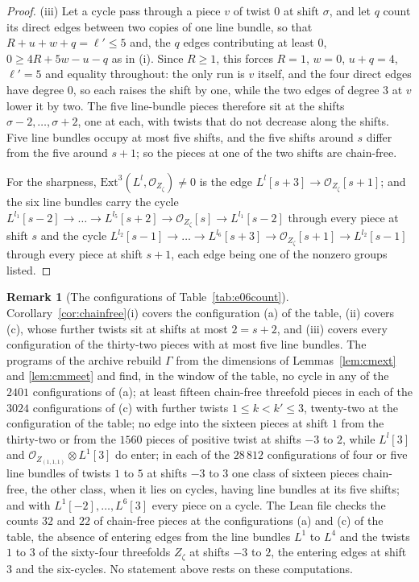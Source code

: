 \documentclass[11pt,reqno]{amsart}
\numberwithin{equation}{section}
\theoremstyle{plain}
\theoremstyle{definition}
\newtheorem{remark}[theorem]{Remark}
\newcommand{\Ext}{\mathrm{Ext}}
\begin{document}
\begin{proof}
(iii) Let a cycle pass through a piece $v$ of twist $0$ at shift $\sigma$, and let $q$ count its direct edges between two copies of one line bundle, so that $R+u+w+q=\ell'\le5$ and, the $q$ edges contributing at least $0$, $0\ge4R+5w-u-q$ as in (i). Since $R\ge1$, this forces $R=1$, $w=0$, $u+q=4$, $\ell'=5$ and equality throughout: the only run is $v$ itself, and the four direct edges have degree $0$, so each raises the shift by one, while the two edges of degree $3$ at $v$ lower it by two. The five line-bundle pieces therefore sit at the shifts $\sigma-2,\dots,\sigma+2$, one at each, with twists that do not decrease along the shifts. Five line bundles occupy at most five shifts, and the five shifts around $s$ differ from the five around $s+1$; so the pieces at one of the two shifts are chain-free.

For the sharpness, $\Ext^{3}(L^{l},\mathcal{O}_{Z_{\zeta}})\ne0$ is the edge $L^{l}[s+3]\to\mathcal{O}_{Z_{\zeta}}[s+1]$; and the six line bundles carry the cycle $L^{l_{1}}[s-2]\to\dots\to L^{l_{5}}[s+2]\to\mathcal{O}_{Z_{\zeta}}[s]\to L^{l_{1}}[s-2]$ through every piece at shift $s$ and the cycle $L^{l_{2}}[s-1]\to\dots\to L^{l_{6}}[s+3]\to\mathcal{O}_{Z_{\zeta}}[s+1]\to L^{l_{2}}[s-1]$ through every piece at shift $s+1$, each edge being one of the nonzero groups listed.
\end{proof}

\begin{remark}[The configurations of Table~\ref{tab:e06count}]\label{rem:chainfreecount}
Corollary~\ref{cor:chainfree}(i) covers the configuration (a) of the table, (ii) covers (c), whose further twists sit at shifts at most $2=s+2$, and (iii) covers every configuration of the thirty-two pieces with at most five line bundles. The programs of the archive rebuild $\Gamma$ from the dimensions of Lemmas~\ref{lem:cmext} and \ref{lem:cmmeet} and find, in the window of the table, no cycle in any of the $2401$ configurations of (a); at least fifteen chain-free threefold pieces in each of the $3024$ configurations of (c) with further twists $1\le k<k'\le3$, twenty-two at the configuration of the table; no edge into the sixteen pieces at shift $1$ from the thirty-two or from the $1560$ pieces of positive twist at shifts $-3$ to $2$, while $L^{l}[3]$ and $\mathcal{O}_{Z_{(1,1,1)}}\otimes L^{1}[3]$ do enter; in each of the $28\,812$ configurations of four or five line bundles of twists $1$ to $5$ at shifts $-3$ to $3$ one class of sixteen pieces chain-free, the other class, when it lies on cycles, having line bundles at its five shifts; and with $L^{1}[-2],\dots,L^{6}[3]$ every piece on a cycle. The Lean file checks the counts $32$ and $22$ of chain-free pieces at the configurations (a) and (c) of the table, the absence of entering edges from the line bundles $L^{1}$ to $L^{4}$ and the twists $1$ to $3$ of the sixty-four threefolds $Z_{\zeta}$ at shifts $-3$ to $2$, the entering edges at shift $3$ and the six-cycles. No statement above rests on these computations.
\end{remark}
\end{document}

